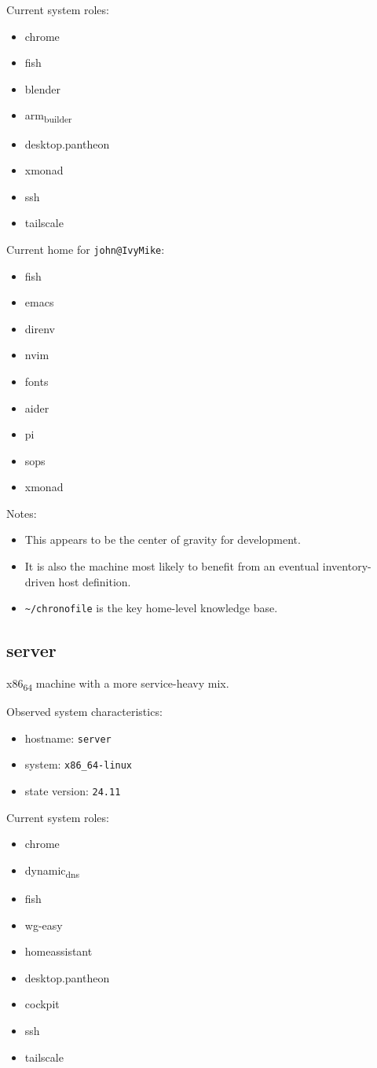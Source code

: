 \documentclass[11pt]{article}
\begin{document}
Current system roles:
\begin{itemize}
\item chrome
\item fish
\item blender
\item arm\textsubscript{builder}
\item desktop.pantheon
\item xmonad
\item ssh
\item tailscale
\end{itemize}

Current home for \texttt{john@IvyMike}:
\begin{itemize}
\item fish
\item emacs
\item direnv
\item nvim
\item fonts
\item aider
\item pi
\item sops
\item xmonad
\end{itemize}

Notes:
\begin{itemize}
\item This appears to be the center of gravity for development.
\item It is also the machine most likely to benefit from an eventual inventory-
driven host definition.
\item \texttt{\textasciitilde{}/chronofile} is the key home-level knowledge base.
\end{itemize}
\subsection{server}
\label{sec:org9b56f94}
x86\textsubscript{64} machine with a more service-heavy mix.

Observed system characteristics:
\begin{itemize}
\item hostname: \texttt{server}
\item system: \texttt{x86\_64-linux}
\item state version: \texttt{24.11}
\end{itemize}

Current system roles:
\begin{itemize}
\item chrome
\item dynamic\textsubscript{dns}
\item fish
\item wg-easy
\item homeassistant
\item desktop.pantheon
\item cockpit
\item ssh
\item tailscale
\end{itemize}
\end{document}
